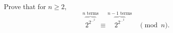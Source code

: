 Prove that for $n\geq 2$,
\[
\overbrace{2^{2^{\cdots^{2}}}}^{\mbox{$n$ terms}} \equiv
\overbrace{2^{2^{\cdots^{2}}}}^{\mbox{$n-1$ terms}} \quad \pmod{n}.
\]
